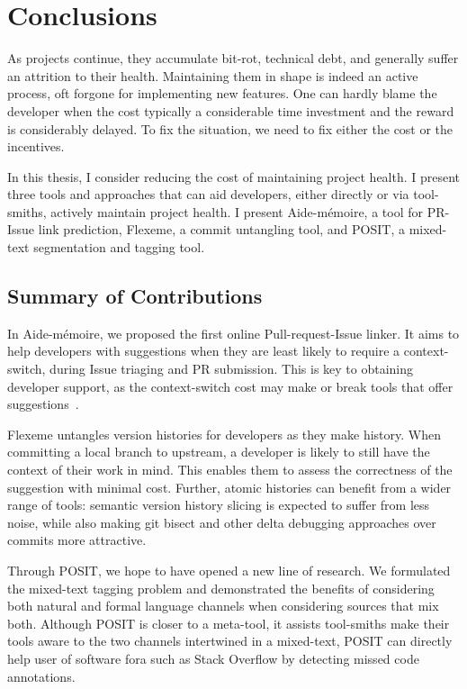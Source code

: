 \chapter{Conclusions}
\label{chapter:conclusions}

As projects continue, they accumulate bit-rot, technical debt, and generally
suffer an attrition to their health. Maintaining them in shape is indeed an
active process, oft forgone for implementing new features. One can hardly blame
the developer when the cost typically a considerable time investment and the
reward is considerably delayed. To fix the situation, we need to fix either the
cost or the incentives.

In this thesis, I consider reducing the cost of maintaining project health. I
present three tools and approaches that can aid developers, either directly or
via tool-smiths, actively maintain project health. I present Aide-mémoire, a
tool for PR-Issue link prediction, Flexeme, a commit untangling tool, and POSIT,
a mixed-text segmentation and tagging tool. 

\section{Summary of Contributions}

In Aide-mémoire, we proposed the first online Pull-request-Issue linker. It aims
to help developers with suggestions when they are least likely to require a
context-switch, during Issue triaging and PR submission. This is key to
obtaining developer support, as the context-switch cost may make or break tools
that offer suggestions~\cite{ohearnKeynote2020}.

Flexeme untangles version histories for developers as they make history. When
committing a local branch to upstream, a developer is likely to still have the
context of their work in mind. This enables them to assess the correctness of
the suggestion with minimal cost. Further, atomic histories can benefit from a
wider range of tools: semantic version history slicing is expected to suffer
from less noise, while also making git bisect and other delta debugging
approaches over commits more attractive.

Through POSIT, we hope to have opened a new line of research. We formulated the
mixed-text tagging problem and demonstrated the benefits of considering both
natural and formal language channels when considering sources that mix both.
Although POSIT is closer to a meta-tool, it assists tool-smiths make their tools
aware to the two channels intertwined in a mixed-text, POSIT can directly help
user of software fora such as Stack Overflow by detecting missed code
annotations.

